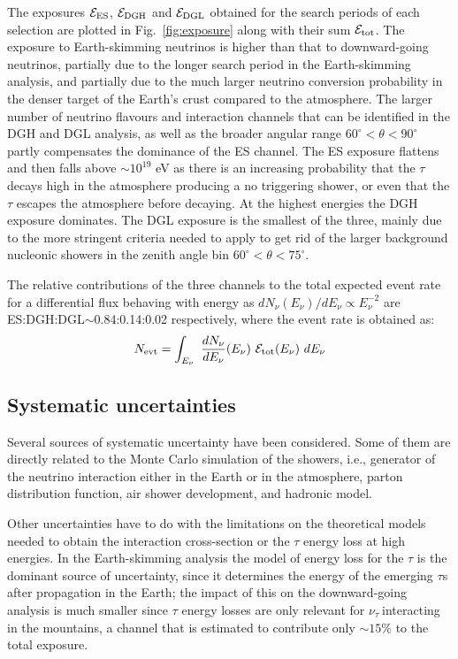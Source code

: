 \documentclass[reprint,showpacs,showkeys,amsmath,amssymb,aps,nofootinbib]{revtex4-1}
\def \nutau {$\nu_\tau~$}
\begin{document}
The exposures ${\cal E}_{\rm ES}$, ${\cal E}_{\rm DGH}$ 
and ${\cal E}_{\rm DGL}$ obtained for the search periods of each selection 
are plotted in Fig.~\ref{fig:exposure} along with their sum $\cal E_{\rm tot}$. 
The exposure to Earth-skimming neutrinos is higher than that to 
downward-going neutrinos,  
partially due to the longer search period in the Earth-skimming 
analysis, and partially due to the much larger neutrino conversion
probability in the denser target of the Earth's crust compared to the 
atmosphere. The larger number of neutrino flavours and interaction channels 
that can be identified in the DGH and DGL analysis, 
as well as the broader angular range $60^\circ<\theta<90^\circ$ 
partly compensates the dominance of the ES channel.  
The ES exposure flattens and then falls above $\sim 10^{19}$ eV as there is an
increasing probability that the $\tau$ decays high in the atmosphere producing a 
no triggering shower, or even that the $\tau$ escapes the atmosphere before decaying.
At the highest energies the DGH exposure dominates.
The DGL exposure is the smallest of the three, mainly due to the more stringent
criteria needed to apply to get rid of the larger background nucleonic showers
in the zenith angle bin $60^\circ<\theta<75^\circ$.

The relative contributions of the three channels 
to the total expected event rate 
for a differential flux behaving with energy as $dN_\nu(E_\nu)/dE_\nu \propto E_\nu^{-2}$ 
are ES:DGH:DGL$\sim$0.84:0.14:0.02 respectively, where the event rate is obtained as:
%
\begin{equation} 
N_{\rm evt}={\int_{E_{\nu}}~\frac{dN_\nu}{dE_\nu}(E_\nu)~{\cal E}_{\rm tot}(E_\nu)~dE_\nu}
\label{eq:Nevt}
\end{equation}
%

\subsection{Systematic uncertainties}

Several sources of systematic uncertainty have been considered.
Some of them are directly related to the Monte Carlo simulation of the showers,
i.e., generator of the neutrino interaction either in the Earth or in the 
atmosphere, parton distribution function, air shower development, and
hadronic model. 

Other uncertainties have to do with the limitations on the
theoretical models needed to obtain the interaction
cross-section or the $\tau$ energy loss at high energies.
In the Earth-skimming analysis the model of energy
loss for the $\tau$ is the dominant source of uncertainty, since it determines the 
energy of the emerging $\tau$s after propagation in the Earth; the impact of this on the downward-going analysis is 
much smaller since $\tau$ energy losses are only relevant for \nutau interacting
in the mountains, a channel that is estimated to contribute only $\sim15\%$ to the total exposure. 
\end{document}
